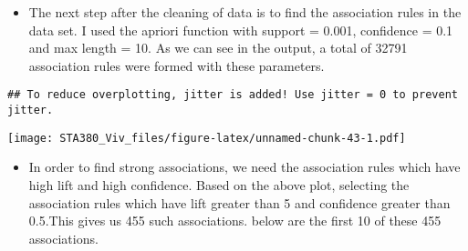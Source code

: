 \documentclass[
  12pt,
]{article}
\providecommand{\tightlist}{%
  \setlength{\itemsep}{0pt}\setlength{\parskip}{0pt}}
\begin{document}
\begin{itemize}
\tightlist
\item
  The next step after the cleaning of data is to find the association
  rules in the data set. I used the apriori function with support =
  0.001, confidence = 0.1 and max length = 10. As we can see in the
  output, a total of 32791 association rules were formed with these
  parameters.
\end{itemize}

\begin{verbatim}
## To reduce overplotting, jitter is added! Use jitter = 0 to prevent jitter.
\end{verbatim}

\texttt{[image: STA380\_Viv\_files/figure-latex/unnamed-chunk-43-1.pdf]}

\begin{itemize}
\tightlist
\item
  In order to find strong associations, we need the association rules
  which have high lift and high confidence. Based on the above plot,
  selecting the association rules which have lift greater than 5 and
  confidence greater than 0.5.This gives us 455 such associations. below
  are the first 10 of these 455 associations.
\end{itemize}
\end{document}
